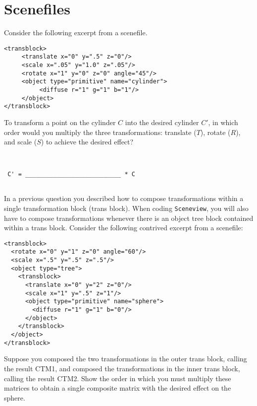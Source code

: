 \documentclass[10pt,twocolumn]{article}
\begin{document}
\section{Scenefiles}
Consider the following excerpt from a scenefile.
\begin{verbatim}
<transblock>
     <translate x="0" y=".5" z="0"/>
     <scale x=".05" y="1.0" z=".05"/>
     <rotate x="1" y="0" z="0" angle="45"/>
     <object type="primitive" name="cylinder">
          <diffuse r="1" g="1" b="1"/> 
     </object>
</transblock>
\end{verbatim}

\begin{framed}
  To transform a point on the cylinder $C$ into the desired cylinder $C'$, in which order would you multiply the three transformations: translate ($T$), rotate ($R$), and scale ($S$) to achieve the desired effect?
\begin{verbatim}


 C' = ___________________________ * C
 
\end{verbatim} 
\end{framed}

\noindent In a previous question you described how to compose transformations within a single transformation block (trans block). When coding {\tt Sceneview}, you will also have to compose transformations whenever there is an object tree block contained within a trans block. Consider the following contrived excerpt from a scenefile:
\begin{verbatim}
<transblock>
  <rotate x="0" y="1" z="0" angle="60"/> 
  <scale x=".5" y=".5" z=".5"/>
  <object type="tree">
    <transblock>
      <translate x="0" y="2" z="0"/>
      <scale x="1" y=".5" z="1"/>
      <object type="primitive" name="sphere">
        <diffuse r="1" g="1" b="0"/> 
      </object>
    </transblock> 
  </object>
</transblock>
\end{verbatim}

\begin{framed}
  Suppose you composed the two transformations in the outer trans block, calling the result CTM1, and composed the transformations in the inner trans block, calling the result CTM2. Show the order in which you must multiply these matrices to obtain a single composite matrix with the desired effect on the sphere.
\end{framed}
\end{document}
